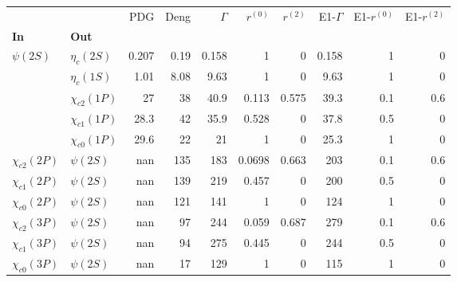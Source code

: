 \begin{tabular}{l|l|r|r|r|r|r|r|r|r}
\toprule
                &            &   PDG &  Deng &  $\Gamma$ &  $r^{(0)}$ &  $r^{(2)}$ &  E1-$\Gamma$ &  E1-$r^{(0)}$ &  E1-$r^{(2)}$ \\
\textbf{In} & \textbf{Out} &       &       &           &            &            &              &               &               \\
\midrule
\textbf{$\psi(2S)$} & \textbf{$\eta_{c}(2S)$} & 0.207 &  0.19 &     0.158 &          1 &          0 &        0.158 &             1 &             0 \\
                & \textbf{$\eta_{c}(1S)$} &  1.01 &  8.08 &      9.63 &          1 &          0 &         9.63 &             1 &             0 \\
                & \textbf{$\chi_{c2}(1P)$} &    27 &    38 &      40.9 &      0.113 &      0.575 &         39.3 &           0.1 &           0.6 \\
                & \textbf{$\chi_{c1}(1P)$} &  28.3 &    42 &      35.9 &      0.528 &          0 &         37.8 &           0.5 &             0 \\
                & \textbf{$\chi_{c0}(1P)$} &  29.6 &    22 &        21 &          1 &          0 &         25.3 &             1 &             0 \\
\textbf{$\chi_{c2}(2P)$} & \textbf{$\psi(2S)$} &   nan &   135 &       183 &     0.0698 &      0.663 &          203 &           0.1 &           0.6 \\
\textbf{$\chi_{c1}(2P)$} & \textbf{$\psi(2S)$} &   nan &   139 &       219 &      0.457 &          0 &          200 &           0.5 &             0 \\
\textbf{$\chi_{c0}(2P)$} & \textbf{$\psi(2S)$} &   nan &   121 &       141 &          1 &          0 &          124 &             1 &             0 \\
\textbf{$\chi_{c2}(3P)$} & \textbf{$\psi(2S)$} &   nan &    97 &       244 &      0.059 &      0.687 &          279 &           0.1 &           0.6 \\
\textbf{$\chi_{c1}(3P)$} & \textbf{$\psi(2S)$} &   nan &    94 &       275 &      0.445 &          0 &          244 &           0.5 &             0 \\
\textbf{$\chi_{c0}(3P)$} & \textbf{$\psi(2S)$} &   nan &    17 &       129 &          1 &          0 &          115 &             1 &             0 \\
\bottomrule
\end{tabular}
